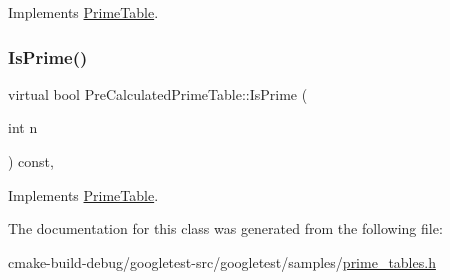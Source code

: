 Implements \mbox{\hyperlink{classPrimeTable_ae537c939f56617d8937d57bbbae3ab30}{Prime\+Table}}.

\mbox{\label{classPreCalculatedPrimeTable_a8a9ab7f99b09e5e987933c260e7304cf}} 
\subsubsection{\texorpdfstring{IsPrime()}{IsPrime()}}
{\footnotesize\ttfamily virtual bool Pre\+Calculated\+Prime\+Table\+::\+Is\+Prime (\begin{DoxyParamCaption}\item[{int}]{n }\end{DoxyParamCaption}) const\hspace{0.3cm}{\ttfamily [inline]}, {\ttfamily [virtual]}}



Implements \mbox{\hyperlink{classPrimeTable_a2ab9243364ded0c51541f641b2df362a}{Prime\+Table}}.



The documentation for this class was generated from the following file\+:\begin{DoxyCompactItemize}
\item 
cmake-\/build-\/debug/googletest-\/src/googletest/samples/\mbox{\hyperlink{prime__tables_8h}{prime\+\_\+tables.\+h}}\end{DoxyCompactItemize}
